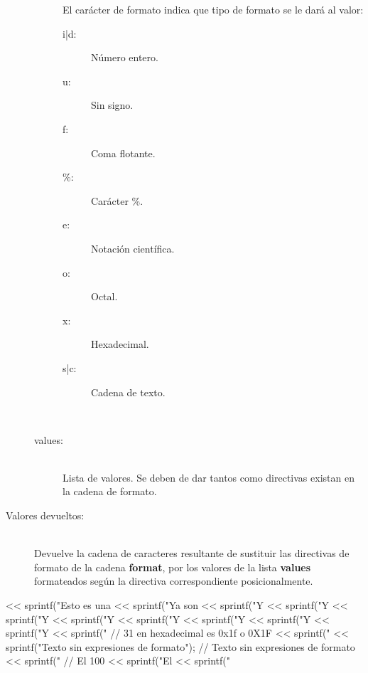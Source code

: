 \begin{framed}
\begin{description}
\begin{description}
		El carácter de formato indica que tipo de formato se le dará al valor: 
		\begin{description}
			\item[  i|d:] Número entero.
			\item[  u:] Sin signo.
			\item[  f:] Coma flotante.
			\item[  \%:] Carácter \%.
			\item[  e:] Notación científica.
			\item[  o:] Octal.
			\item[  x:] Hexadecimal.
			\item[  s|c:] Cadena de texto.
		\end{description} \hfill \\
   \item[values:] \hfill \\ Lista de valores. Se deben de dar tantos como directivas existan en la cadena de formato.
      
   \end{description}
\item[Valores devueltos:] \hfill \\
   Devuelve la cadena de caracteres resultante de sustituir las directivas de formato de la cadena \textbf{format}, por los valores  de la lista \textbf{values} formateados 
   según la directiva correspondiente posicionalmente.
\end{description}
\end{framed}

\begin{myverbatim}   
   << sprintf("Esto es una %
   << sprintf("Ya son %
   << sprintf("Y %
   << sprintf("Y %
   << sprintf("Y %
   << sprintf("Y %
   << sprintf("Y %
   << sprintf("Y %
   << sprintf("Y %
   << sprintf("Y %
   << sprintf("%
   // 31 en hexadecimal es 0x1f o 0X1F
   << sprintf("%
   << sprintf("Texto sin expresiones de formato"); // Texto sin expresiones de formato
   << sprintf("%
   // El 100%
   << sprintf("El %
   << sprintf("%
\end{myverbatim}

